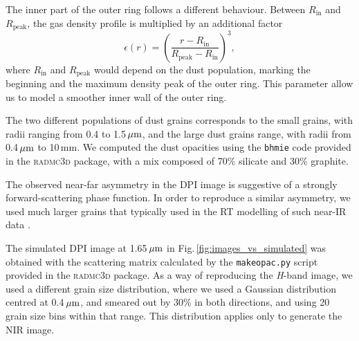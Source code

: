 \documentclass[letters,usenatbib,times]{mnras}
\begin{document}
The inner part of the outer ring follows a different behaviour. Between $R_\mathrm{in}$ and $R_\mathrm{peak}$, the gas density profile is multiplied by an additional factor
\begin{equation}
    \epsilon(r) = \left(\frac{ r - R_\mathrm{in}}{R_\mathrm{peak} - R_\mathrm{in}}\right)^3,
\end{equation}
where $R_\mathrm{in}$ and $R_\mathrm{peak}$ would depend on the dust population, marking the beginning and the maximum density peak of the outer ring. This parameter allow us to model a smoother inner wall of the outer ring.

The two different populations of dust grains corresponds to the small grains, with radii ranging from 0.4 to 1.5\,$\hbox{$\mu$m}$, and the large dust grains range, with radii from 0.4\,$\hbox{$\mu$m}$ to 10\,mm. We computed the dust opacities using the {\tt bhmie} code provided in the \textsc{radmc3d} package, with a mix composed of 70\% silicate and 30\% graphite. 

The observed near-far asymmetry in the DPI image is suggestive of a strongly forward-scattering phase function. In order to reproduce a similar asymmetry, we used much larger grains that typically used in the RT modelling of such near-IR data \citep[e.g.,][]{2018MNRAS.477.5104C}. 

The simulated DPI image at 1.65\,$\hbox{$\mu$m}$ in Fig.\,\ref{fig:images_vs_simulated} was obtained with the scattering matrix calculated by the {\tt makeopac.py} script provided in the \textsc{radmc3d} package. As a way of reproducing the \textit{H}-band image, we used a different grain size distribution, where we used a Gaussian distribution centred at 0.4\,$\hbox{$\mu$m}$, and smeared out by 30\% in both directions, and using 20 grain size bins within that range. This distribution applies only to generate the NIR image.
\end{document}
